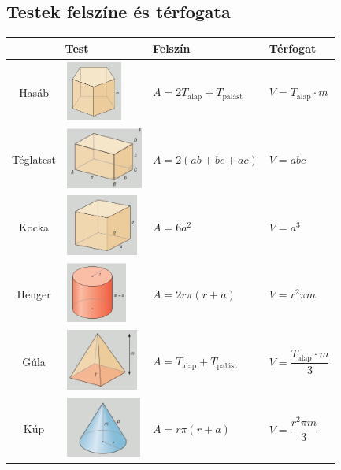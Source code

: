 \documentclass[12pt,a4paper]{article}
\begin{document}
\subsection{Testek felszíne és térfogata}
\begin{center}
\begin{tabular}{c|m{4cm}|m{4.5cm}|m{4.5cm}}
\multicolumn{2}{c|}{\textbf{Test}} & \textbf{Felszín} & \textbf{Térfogat} \\ \hline
Hasáb &\centering \includegraphics[height=2cm]{felszin_terfogat_1}&$A=2T_{\text{alap}}+T_{\text{palást}}$&$V=T_{\text{alap}}\cdot m$ \\ \hline
Téglatest &\centering \includegraphics[height=2cm]{felszin_terfogat_2}&$A=2(ab+bc+ac)$&$V=abc$ \\ \hline
Kocka &\centering \includegraphics[height=2cm]{felszin_terfogat_3}&$A=6a^2$&$V=a^3$ \\ \hline
Henger &\centering \includegraphics[height=2cm]{felszin_terfogat_4}&$A=2r\pi(r+a)$&$V=r^2\pi m$ \\ \hline
Gúla &\centering \includegraphics[height=2cm]{felszin_terfogat_5}&$A=T_{\text{alap}}+T_{\text{palást}}$&$V=\dfrac{T_{\text{alap}}\cdot m}{3}$ \\ \hline
Kúp &\centering \includegraphics[height=2cm]{felszin_terfogat_6}&$A=r\pi(r+a)$&$V=\dfrac{r^2\pi m}{3}$ \\ \hline

\end{tabular}
\end{center}
\end{document}
